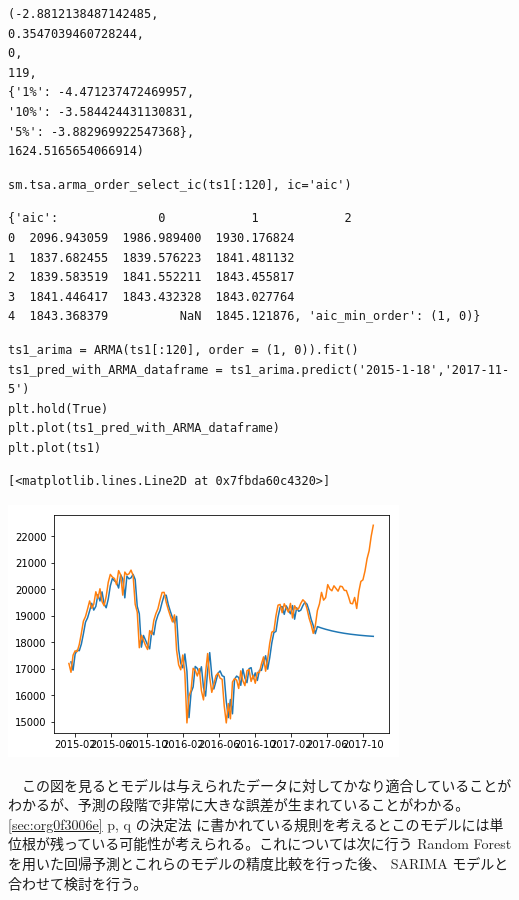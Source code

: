\documentclass{scrartcl}
\begin{document}
\begin{verbatim}
(-2.8812138487142485,
0.3547039460728244,
0,
119,
{'1%': -4.471237472469957,
'10%': -3.584424431130831,
'5%': -3.882969922547368},
1624.5165654066914)
\end{verbatim}

\begin{verbatim}
sm.tsa.arma_order_select_ic(ts1[:120], ic='aic')
\end{verbatim}

\begin{verbatim}
{'aic':              0            1            2
0  2096.943059  1986.989400  1930.176824
1  1837.682455  1839.576223  1841.481132
2  1839.583519  1841.552211  1843.455817
3  1841.446417  1843.432328  1843.027764
4  1843.368379          NaN  1845.121876, 'aic_min_order': (1, 0)}
\end{verbatim}

\begin{verbatim}
ts1_arima = ARMA(ts1[:120], order = (1, 0)).fit()
ts1_pred_with_ARMA_dataframe = ts1_arima.predict('2015-1-18','2017-11-5')
plt.hold(True)
plt.plot(ts1_pred_with_ARMA_dataframe)
plt.plot(ts1)
\end{verbatim}

\begin{verbatim}
[<matplotlib.lines.Line2D at 0x7fbda60c4320>]
\end{verbatim}
\begin{center}
\includegraphics[width=.9\linewidth]{./obipy-resources/cAoUWN.png}
\end{center}

　この図を見るとモデルは与えられたデータに対してかなり適合していることがわかるが、予測の段階で非常に大きな誤差が生まれていることがわかる。 \ref{sec:org0f3006e} p, q の決定法 に書かれている規則を考えるとこのモデルには単位根が残っている可能性が考えられる。これについては次に行う Random Forest を用いた回帰予測とこれらのモデルの精度比較を行った後、 SARIMA モデルと合わせて検討を行う。\\
\end{document}

